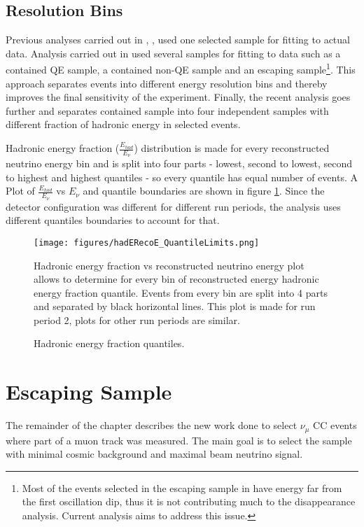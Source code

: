 \subsection{Resolution Bins}
Previous analyses carried out in \cite{Kanika}, \cite{Dominick}, \cite{Susan} used one selected sample for 
fitting to actual data. Analysis carried out in \cite{Nick} used several samples for fitting to data 
such as a contained QE sample, a contained non-QE sample and an escaping sample\footnote{Most of the events 
selected in the escaping sample in \cite{Nick} have energy far from the first oscillation dip, thus it is not 
contributing much to the disappearance analysis. Current analysis aims to address this issue.}. This 
approach separates events into different energy resolution bins and thereby improves the final sensitivity 
of the experiment. Finally, the recent analysis \cite{Luke} goes further and separates contained sample into 
four independent samples with different fraction of hadronic energy in selected events. 

Hadronic energy fraction ($\frac{E_{had}}{E_\nu}$) distribution is made for every reconstructed neutrino energy
bin and is split into four parts - lowest, second to lowest, second to highest and highest
quantiles - so every quantile has equal number of events. A Plot of $\frac{E_{had}}{E_\nu}$ vs $E_\nu$ and 
quantile boundaries are shown in figure \ref{fig:hadE_Quant}. Since the detector configuration was different for 
different run periods, the analysis uses different quantiles boundaries to account for that. 
\begin{figure}[h]
\centering
\texttt{[image: figures/hadERecoE\_QuantileLimits.png]}
\caption{Hadronic energy fraction quantiles.}
{Hadronic energy fraction vs reconstructed neutrino energy plot allows to determine for every bin of
reconstructed energy hadronic energy fraction quantile. Events from every bin are split into 4 parts
and separated by black horizontal lines. This plot is made for run period 2, plots for other run periods 
are similar.}
\label{fig:hadE_Quant}
\end{figure}

\section{Escaping Sample} \label{esc_sec}
The remainder of the chapter describes the new work done to select $\nu_\mu$ CC events where part of 
a muon track was measured. The main goal is to select the sample with minimal cosmic background and maximal
beam neutrino signal.


